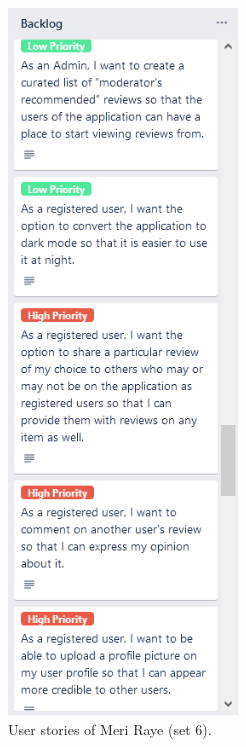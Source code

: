 \documentclass[11pt]{extarticle}
\begin{document}
\begin{center}
    \begin{figure}[H]
        \centering
        \includegraphics[width=2.4in]{Figures/user_stories_6.png}
        \caption{User stories of Meri Raye (set 6).}
    \end{figure}
\end{center}
\end{document}
